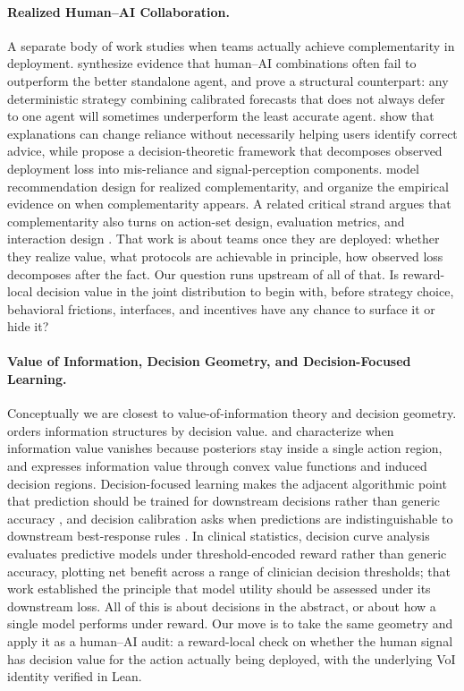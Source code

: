 \paragraph{Realized Human--AI Collaboration.}
A separate body of work studies when teams actually achieve complementarity in deployment.
\citet{Vaccaro2024} synthesize evidence that human--AI combinations often fail to outperform the better standalone agent, and \citet{PengGargKleinberg2025} prove a structural counterpart: any deterministic strategy combining calibrated forecasts that does not always defer to one agent will sometimes underperform the least accurate agent.
\citet{SchoefferEtAl2024} show that explanations can change reliance without necessarily helping users identify correct advice, while \citet{GuoEtAl2024reliance} propose a decision-theoretic framework that decomposes observed deployment loss into mis-reliance and signal-perception components.
\citet{McLaughlinSpiess2024} model recommendation design for realized complementarity, and \citet{HemmerEtAl2025} organize the empirical evidence on when complementarity appears.
A related critical strand argues that complementarity also turns on action-set design, evaluation metrics, and interaction design \citep{StraitouriEtAl2025}.
That work is about teams once they are deployed: whether they realize value, what protocols are achievable in principle, how observed loss decomposes after the fact. Our question runs upstream of all of that. Is reward-local decision value in the joint distribution to begin with, before strategy choice, behavioral frictions, interfaces, and incentives have any chance to surface it or hide it?

\paragraph{Value of Information, Decision Geometry, and Decision-Focused Learning.}
Conceptually we are closest to value-of-information theory and decision geometry.
\citet{Blackwell1951} orders information structures by decision value. \citet{RadnerStiglitz1984} and \citet{DeLaraGossner2020} characterize when information value vanishes because posteriors stay inside a single action region, and \citet{KamenicaGentzkow2011} expresses information value through convex value functions and induced decision regions.
Decision-focused learning makes the adjacent algorithmic point that prediction should be trained for downstream decisions rather than generic accuracy \citep{Elmachtoub2022,Wilder2019}, and decision calibration asks when predictions are indistinguishable to downstream best-response rules \citep{Zhao2021}.
In clinical statistics, decision curve analysis \citep{Vickers2006} evaluates predictive models under threshold-encoded reward rather than generic accuracy, plotting net benefit across a range of clinician decision thresholds; that work established the principle that model utility should be assessed under its downstream loss.
All of this is about decisions in the abstract, or about how a single model performs under reward. Our move is to take the same geometry and apply it as a human--AI audit: a reward-local check on whether the human signal has decision value for the action actually being deployed, with the underlying VoI identity verified in Lean.
